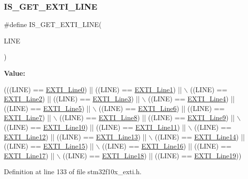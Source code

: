 \subsubsection{\texorpdfstring{I\+S\+\_\+\+G\+E\+T\+\_\+\+E\+X\+T\+I\+\_\+\+L\+I\+NE}{IS\_GET\_EXTI\_LINE}}
{\footnotesize\ttfamily \#define I\+S\+\_\+\+G\+E\+T\+\_\+\+E\+X\+T\+I\+\_\+\+L\+I\+NE(\begin{DoxyParamCaption}\item[{}]{L\+I\+NE }\end{DoxyParamCaption})}

{\bfseries Value\+:}
\begin{DoxyCode}
(((LINE) == \hyperlink{group___e_x_t_i___lines_gac2a65680200dd5f4f7eab29cd4091a75}{EXTI\_Line0}) || ((LINE) == \hyperlink{group___e_x_t_i___lines_gae7c6ab2a0880ce3810641ee0585104cd}{EXTI\_Line1}) || \(\backslash\)
                            ((LINE) == \hyperlink{group___e_x_t_i___lines_gaec4189bb2709c8c15a0339d1b0b9865a}{EXTI\_Line2}) || ((LINE) == 
      \hyperlink{group___e_x_t_i___lines_gadea3ef6ab7e8bacc686689de8711b98c}{EXTI\_Line3}) || \(\backslash\)
                            ((LINE) == \hyperlink{group___e_x_t_i___lines_gab33b1fe19306e9e60f8f8d0928b800be}{EXTI\_Line4}) || ((LINE) == 
      \hyperlink{group___e_x_t_i___lines_ga6b4c6292e3abd521cab2bf99d37a15c6}{EXTI\_Line5}) || \(\backslash\)
                            ((LINE) == \hyperlink{group___e_x_t_i___lines_ga97a5145d1d2612dd53bdd9db3d366873}{EXTI\_Line6}) || ((LINE) == 
      \hyperlink{group___e_x_t_i___lines_ga3b7155d54a4a98394b599718901ccbe5}{EXTI\_Line7}) || \(\backslash\)
                            ((LINE) == \hyperlink{group___e_x_t_i___lines_gacd51e087a088c3315049394cddf79e88}{EXTI\_Line8}) || ((LINE) == 
      \hyperlink{group___e_x_t_i___lines_ga340ca6bb77b7a2d7747c78e7d3370360}{EXTI\_Line9}) || \(\backslash\)
                            ((LINE) == \hyperlink{group___e_x_t_i___lines_gaefb90b266f5fc1571ed4606bbff1f1d7}{EXTI\_Line10}) || ((LINE) == 
      \hyperlink{group___e_x_t_i___lines_ga6157b34c53e9b5cb8ee0d7ac3f5ba292}{EXTI\_Line11}) || \(\backslash\)
                            ((LINE) == \hyperlink{group___e_x_t_i___lines_gab73a0a31f1814118955099b9dd3bdfef}{EXTI\_Line12}) || ((LINE) == 
      \hyperlink{group___e_x_t_i___lines_gae382388ac34b78917a7bd06562e35c42}{EXTI\_Line13}) || \(\backslash\)
                            ((LINE) == \hyperlink{group___e_x_t_i___lines_ga7b3821ad1b7a00b49c27075688f48101}{EXTI\_Line14}) || ((LINE) == 
      \hyperlink{group___e_x_t_i___lines_gafc5ea85d1fc095a855fde8977a338c4c}{EXTI\_Line15}) || \(\backslash\)
                            ((LINE) == \hyperlink{group___e_x_t_i___lines_ga21326db7db8ca614c746b7f52dc45ead}{EXTI\_Line16}) || ((LINE) == 
      \hyperlink{group___e_x_t_i___lines_ga3e0fc18bc0722adc09605e3093b24c6a}{EXTI\_Line17}) || \(\backslash\)
                            ((LINE) == \hyperlink{group___e_x_t_i___lines_ga6cdf346a3e7a3c8dbb036aca6741207c}{EXTI\_Line18}) || ((LINE) == 
      \hyperlink{group___e_x_t_i___lines_ga49ac0744621f88d432d85838483ad1de}{EXTI\_Line19}))
\end{DoxyCode}


Definition at line 133 of file stm32f10x\+\_\+exti.\+h.


